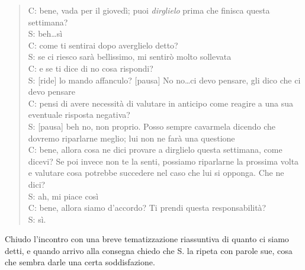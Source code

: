 \begin{verse}
C: bene, vada per il giovedì; puoi \emph{dirglielo} prima che finisca questa settimana?\\
S: beh\ldots sì\\
C: come ti sentirai dopo averglielo detto?\\
S: se ci riesco sarà bellissimo, mi sentirò molto sollevata\\
C: e se ti dice di no cosa rispondi?\\
S: [ride] lo mando affanculo? [pausa] No no\ldots ci devo pensare, gli dico che ci devo pensare\\
C: pensi di avere necessità di valutare in anticipo come reagire a una sua eventuale risposta negativa?\\
S: [pausa] beh no, non proprio. Posso sempre cavarmela dicendo che dovremo riparlarne meglio; lui non ne farà una questione\\
C:  bene, allora cosa ne dici provare a dirglielo questa settimana, come dicevi? Se poi invece non te la senti, possiamo riparlarne la prossima volta e valutare cosa potrebbe succedere nel caso che lui si opponga. Che ne dici?\\
S: ah, mi piace così\\
C: bene, allora siamo d'accordo? Ti prendi questa responsabilità?\\
S: sì.\\
\end{verse}

\noindent Chiudo l'incontro con una breve tematizzazione riassuntiva di quanto ci siamo detti, e quando arrivo alla consegna chiedo che S. la ripeta con parole sue, cosa che sembra darle una certa soddisfazione.

 
